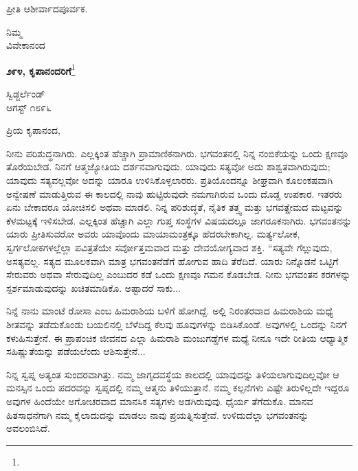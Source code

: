 ಪ್ರೀತಿ ಆಶೀರ್ವಾದಪೂರ್ವಕ.

\vspace{-0.5cm}

{\flushright
ನಿಮ್ಮ\\ವಿವೇಕಾನಂದ\par}

\begin{center}
\textbf{೨೯೪, ಕೃಪಾನಂದರಿಗೆ}\footnote{}
\end{center}

\vspace{-0.5cm}

\begin{flushright}
ಸ್ವಿಡ್ಜರ್ಲೆಂಡ್\\ಆಗಸ್ಟ್ ೧೮೯೬
\end{flushright}

\vspace{-0.3cm}

\noindent
ಪ್ರಿಯ ಕೃಪಾನಂದ,

ನೀನು ಪರಿಶುದ್ಧನಾಗಿರು. ಎಲ್ಲಕ್ಕಿಂತ ಹೆಚ್ಚಾಗಿ ಪ್ರಾಮಾಣಿಕನಾಗಿರು. \hbox{ಭಗವಂತನಲ್ಲಿ} ನಿನ್ನ ನಂಬಿಕೆಯನ್ನು ಒಂದು ಕ್ಷಣವೂ ತೊರೆಯಬೇಡ. ನಿನಗೆ ಆತ್ಮಜ್ಯೋತಿಯ ದರ್ಶನವಾಗುವುದು. ಯಾವುದು ಸತ್ಯವೋ ಅದು ಶಾಶ್ವತವಾಗಿರುವುದು; ಯಾವುದು ಸತ್ಯವಲ್ಲವೋ ಅದನ್ನು ಯಾರೂ ಉಳಿಸಿಕೊಳ್ಳಲಾರರು. ಪ್ರತಿಯೊಂದನ್ನೂ ಶೀಘ್ರವಾಗಿ ಕೂಲಂಕಷವಾಗಿ ಅನ್ವೇಷಣೆ ಮಾಡುತ್ತಿರುವ ಈ ಕಾಲದಲ್ಲಿ ನಾವು ಹುಟ್ಟಿರುವುದೇ ನಮಗಾಗಿರುವ ಒಂದು ದೊಡ್ಡ ಉಪಕಾರ. ಇತರರು ಏನು ಬೇಕಾದರೂ ಯೋಚಿಸಲಿ ಅಥವಾ ಮಾಡಲಿ. ನಿನ್ನ ಪರಿಶುದ್ಧತೆ, ನೈತಿಕ ತತ್ತ್ವ ಮತ್ತು ಭಗವತ್ಪ್ರೇಮದ ಮಟ್ಟವನ್ನು ಕೆಳಮಟ್ಟಕ್ಕೆ ಇಳಿಸಬೇಡ. ಎಲ್ಲಕ್ಕಿಂತ ಹೆಚ್ಚಾಗಿ ಎಲ್ಲಾ ಗುಪ್ತ ಸಂಸ್ಥೆಗಳ ವಿಷಯದಲ್ಲೂ ಜಾಗರೂಕನಾಗಿರು. ಭಗವಂತನನ್ನು ಯಾರು ಪ್ರೀತಿಸುವರೋ ಅವರು ಯಾವೊಂದು ಮಾಯಾಮಂತ್ರಕ್ಕೂ ಹೆದರಬೇಕಾಗಿಲ್ಲ. ಮರ್ತ್ಯಲೋಕ, ಸ್ವರ್ಗಲೋಕಗಳಲ್ಲೆಲ್ಲಾ ಪವಿತ್ರತೆಯೇ ಸರ್ವೋತ್ತಮವಾದ ಮತ್ತು ದೇವಯೋಗ್ಯವಾದ ಶಕ್ತಿ. “ಸತ್ಯವೇ ಗೆಲ್ಲುವುದು, ಅಸತ್ಯವಲ್ಲ. ಸತ್ಯದ ಮೂಲಕವಾಗಿ ಮಾತ್ರ ಭಗವಂತನೆಡೆಗೆ ಹೋಗುವ ಹಾದಿ ತೆರೆದಿದೆ. ಯಾರು ನಿನ್ನೊಡನೆ ಒಟ್ಟಿಗೆ ಸೇರುವರು ಅಥವಾ ಸೇರುವುದಿಲ್ಲ ಎಂಬುದರ ಕಡೆ ಒಂದು ಕ್ಷಣವೂ ಗಮನ ಕೊಡಬೇಡ. ನೀನು ಭಗವಂತನ ಕರಗಳನ್ನು ಸ್ಪರ್ಶಮಾಡುವುದನ್ನು ಖಚಿತಮಾಡಿಕೊ. ಅಷ್ಟಾದರೆ ಸಾಕು...

ನಿನ್ನೆ ನಾನು ಮಾಂಟೆ ರೋಸಾ ಎಂಬ ಹಿಮರಾಶಿಯ ಬಳಿಗೆ ಹೋಗಿದ್ದೆ. ಅಲ್ಲಿ ನಿರಂತರವಾದ ಹಿಮರಾಶಿಯ ಮಧ್ಯೆ ಶೀತವನ್ನು ತಡೆದುಕೊಂಡು ಬಯಲಿನಲ್ಲಿ ಬೆಳೆದಿದ್ದ ಕೆಲವು ಹೂವುಗಳನ್ನು ಬಿಡಿಸಿಕೊಂಡೆ. ಅವುಗಳಲ್ಲಿ ಒಂದನ್ನು ನಿನಗೆ ಕಳುಹಿಸುತ್ತೇನೆ. ಈ ಪ್ರಾಪಂಚಿಕ ಜೀವನದ ಎಲ್ಲಾ ಹಿಮರಾಶಿ ಮಂಜುಗಡ್ಡೆಗಳ ಮಧ್ಯೆ ನೀನೂ ಇದೇ ರೀತಿಯ ಆಧ್ಯಾತ್ಮಿಕ ಸಹಿಷ್ಣುತೆಯನ್ನು ಪಡೆಯಲೆಂದು ಆಶಿಸುತ್ತೇನೆ...

ನಿನ್ನ ಸ್ವಪ್ನ ಅತ್ಯಂತ ಸುಂದರವಾಗಿತ್ತು. ನಮ್ಮ ಜಾಗೃದವಸ್ಥೆಯ ಕಾಲದಲ್ಲಿ ಯಾವುದನ್ನು ತಿಳಿಯಲಾಗುವುದಿಲ್ಲವೋ ಆ ಮನಸ್ಸಿನ ಒಂದು ಪದರವನ್ನು ಸ್ವಪ್ನದಲ್ಲಿ ನಮ್ಮ ಆತ್ಮನು ತಿಳಿಯುತ್ತಾನೆ. ನಮ್ಮ ಕಲ್ಪನೆಗಳು ಎಷ್ಟೇ ತಿರುಳಿಲ್ಲದೇ ಇದ್ದರೂ ಅವುಗಳ ಹಿಂದೆಯೇ ಅಗೋಚರವಾದ ಮಾನಸಿಕ ಸತ್ಯಗಳು ಅಡಗಿರುವುವು. ಧೈರ್ಯ ತೆಗೆದುಕೊ. ಮಾನವ ಹಿತಸಾಧನೆಗಾಗಿ ನಮ್ಮ ಕೈಲಾದುದನ್ನು ಮಾಡಲು ನಾವು ಪ್ರಯತ್ನಿಸುತ್ತೇವೆ. ಉಳಿದುದೆಲ್ಲಾ ಭಗವಂತನನ್ನು ಅವಲಂಬಿಸಿದೆ.

